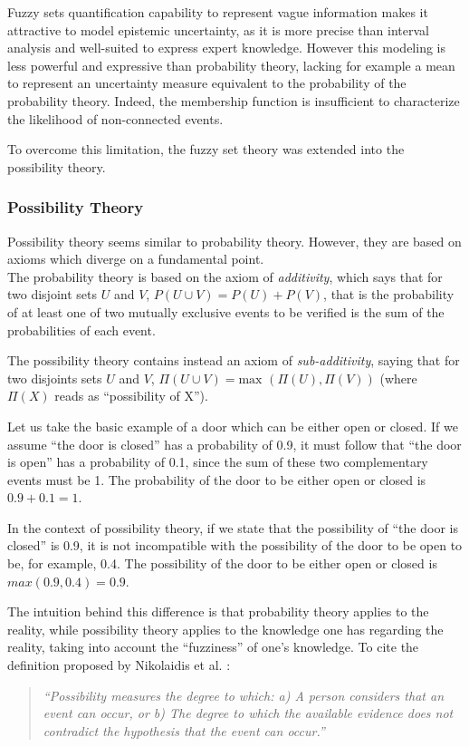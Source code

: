 Fuzzy sets quantification capability to represent vague information makes it attractive to model epistemic uncertainty, as it is more precise than interval analysis and well-suited to express expert knowledge. However this modeling is less powerful and expressive than probability theory, lacking for example a mean to represent an uncertainty measure equivalent to the probability of the probability theory. Indeed, the membership function is insufficient to characterize the likelihood of non-connected events.

To overcome this limitation, the fuzzy set theory was extended into the possibility theory.

\subsubsection{Possibility Theory}

Possibility theory \cite{zadeh1978fuzzy} seems similar to probability theory. However, they are based on axioms which diverge on a fundamental point.\\
The probability theory is based on the axiom of \emph{additivity}, which says that for two disjoint sets $U$ and $V$, $P(U \cup V) = P(U)+ P(V)$, that is the probability of at least one of two mutually exclusive events to be verified is the sum of the probabilities of each event.

The possibility theory contains instead an axiom of \emph{sub-additivity}, saying that for two disjoints sets $U$ and $V$, $\Pi(U \cup V) = \text{max }(\Pi(U), \Pi(V))$ (where $\Pi(X)$ reads as \enquote{possibility of X}).

Let us take the basic example of a door which can be either open or closed. If we assume \enquote{the door is closed} has a probability of 0.9, it must follow that \enquote{the door is open} has a probability of 0.1, since the sum of these two complementary events must be 1. The probability of the door to be either open or closed is $0.9+0.1 = 1$.

In the context of possibility theory, if we state that the possibility of \enquote{the door is closed} is 0.9, it is not incompatible with the possibility of the door to be open to be, for example, 0.4. The possibility of the door to be either open or closed is $max(0.9,0.4) = 0.9$.

The intuition behind this difference is that probability theory applies to the reality, while possibility theory applies to the knowledge one has regarding the reality, taking into account the \enquote{fuzziness} of one's knowledge. To cite the definition proposed by Nikolaidis et al. \cite{nikolaidis:386}:
\begin{quote}\textit{
\enquote{Possibility measures the degree to which: a) A person considers that an event can
occur, or b) The degree to which the available evidence does not contradict the
hypothesis that the event can occur.}}
\end{quote}

